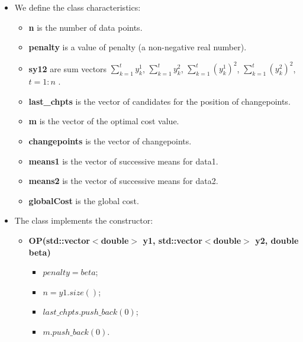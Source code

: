 \documentclass{report}
\begin{document}
	\begin{itemize}
		\item We define the class characteristics: 
		
		\begin{itemize}
			\item {\bfseries n} is the number of data points.
			
			\item {\bfseries penalty} is a value of penalty (a non-negative real number).
			
			\item {\bfseries sy12} are sum vectors $\sum_{k=1}^{t} y^1_k$,  $\sum_{k=1}^{t}y^2_k$, $\sum_{k=1}^{t} (y^1_k)^2$,  $\sum_{k=1}^{t} (y^2_k)^2$, $t = 1:n$ .
			
			\item {\bfseries last\_chpts} is the vector of candidates for the position of changepoints. 
			
			\item {\bfseries m} is the vector of the optimal cost value.
			
			\item {\bfseries changepoints} is the vector of changepoints.
			
			\item {\bfseries means1} is the vector of successive means for data1.
			
			\item {\bfseries means2} is the vector of successive means for data2.
			
			\item {\bfseries globalCost} is the global cost.
		\end{itemize}
		
		\item The class implements the constructor:
		
		\begin{itemize}
			\item {\bfseries OP(std::vector$<$double$>$ y1, std::vector$<$double$>$ y2, double beta)}
			\begin{itemize}
				\item $penalty = beta$;
				
				\item $n = y1.size()$;
				
				\item $last\_chpts.push\_back(0)$;
				
				\item $m.push\_back(0)$.
			\end{itemize}	
		\end{itemize}
		

\end{itemize}
\end{document}
